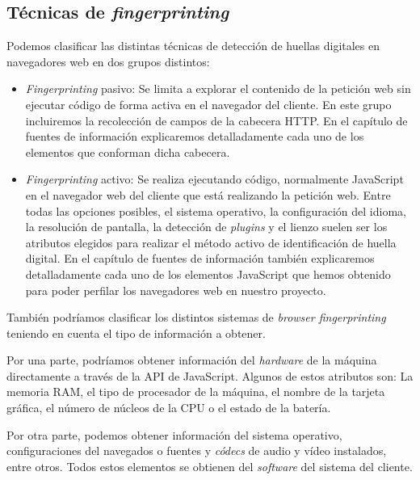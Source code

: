 \subsection{Técnicas de \textit{fingerprinting}}

Podemos clasificar las distintas técnicas de detección de huellas digitales en navegadores web en dos grupos distintos: \par 

\begin{itemize}
	\item \textit{Fingerprinting} pasivo: Se limita a explorar el contenido de la petición web sin ejecutar código de forma activa en el navegador del cliente. En este grupo incluiremos la recolección de campos de la cabecera HTTP. En el capítulo de fuentes de información explicaremos detalladamente cada uno de los elementos que conforman dicha cabecera. \par 
	
	\item \textit{Fingerprinting} activo:  Se realiza ejecutando código, normalmente JavaScript en el navegador web del cliente que está realizando la petición web. Entre todas las opciones posibles, el sistema operativo, la configuración del idioma, la resolución de pantalla, la detección de \textit{plugins} y el lienzo suelen ser los atributos elegidos para realizar el método activo de identificación de huella digital. En el capítulo de fuentes de información también explicaremos detalladamente cada uno de los elementos JavaScript que hemos obtenido para poder perfilar los navegadores web en nuestro proyecto. \par 
	
\end{itemize}

También podríamos clasificar los distintos sistemas de \textit{browser fingerprinting} teniendo en cuenta el tipo de información a obtener. \par 

Por una parte, podríamos obtener información del \textit{hardware} de la máquina directamente a través de la API de JavaScript. Algunos de estos atributos son: La memoria RAM, el tipo de procesador de la máquina, el nombre de la tarjeta gráfica, el número de núcleos de la CPU o el estado de la batería. \par

Por otra parte, podemos obtener información del sistema operativo, configuraciones del navegados o fuentes y \textit{códecs} de audio y vídeo instalados, entre otros. Todos estos elementos se obtienen del \textit{software} del sistema del cliente. \par 

